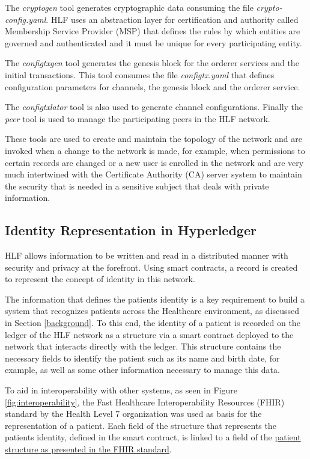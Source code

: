 \documentclass[]{llncs}
\begin{document}
The \textit{cryptogen} tool generates cryptographic data consuming the file
\textit{crypto-config.yaml}.  HLF uses an abstraction layer for certification
and authority called Membership Service Provider (MSP) that defines the rules
by which entities are governed and authenticated and it must be unique for
every participating entity.

The \textit{configtxgen} tool generates the genesis block for the orderer
services and the initial transactions.  This tool consumes the file
\textit{configtx.yaml} that defines configuration parameters for channels, the
genesis block and the orderer service.

The \textit{configtxlator} tool is also used to generate channel configurations. 
Finally the \textit{peer} tool is used to manage the participating peers in the HLF network.

These tools are used to create and maintain the topology of the network and are
invoked when a change to the network is made, for example, when permissions to
certain records are changed or a new user is enrolled in the network and are
very much intertwined with the Certificate Authority (CA) server system to
maintain the security that is needed in a sensitive subject that deals with
private information.

\subsection{Identity Representation in Hyperledger}
 
HLF allows information to be written and read in a distributed manner with
security and privacy at the forefront. Using smart contracts, a record is
created to represent the concept of identity in this network.

The information that defines the patients identity is a key requirement to
build a system that recognizes patients across the Healthcare environment, as
discussed in Section \ref{background}.  To this end, the identity of a patient
is recorded on the ledger of the HLF network as a structure via a smart
contract deployed to the network that interacts directly with the ledger.  This
structure contains the necessary fields to identify the patient such as its
name and birth date, for example, as well as some other information necessary
to manage this data. 

To aid in interoperability with other systems, as seen in Figure
\ref{fig:interoperability}, the Fast Healthcare Interoperability Resources
(FHIR) standard by the Health Level 7 organization was used as basis for the
representation of a patient.  Each field of the structure that represents the
patients identity, defined in the smart contract, is linked to a field of the
\href{http://www.hl7.org/fhir/patient.html}{patient structure as presented in
the FHIR standard}.
\end{document}

